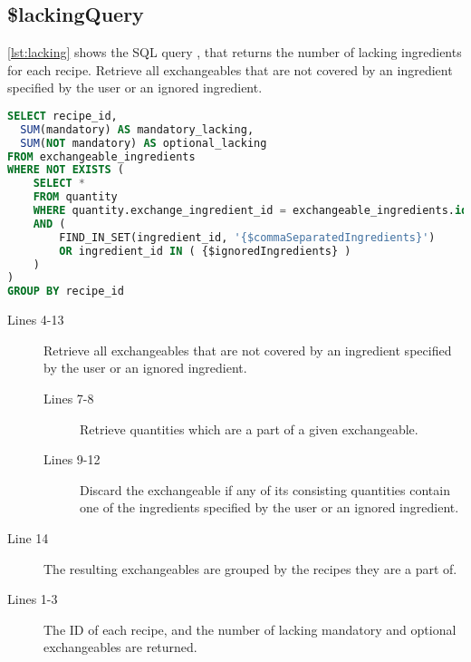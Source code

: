 \subsection*{\$lackingQuery}
\autoref{lst:lacking} shows the SQL query , that returns the number of lacking ingredients for each recipe. Retrieve all exchangeables that are not covered by an ingredient specified by the user or an ignored ingredient.
\begin{lstlisting}[language=SQL, morekeywords={IFNULL}, float=h, label={lst:lacking}, caption={\$lackingQuery, returns the number of lacking ingredients for each recipe.}]
SELECT recipe_id,
  SUM(mandatory) AS mandatory_lacking,
  SUM(NOT mandatory) AS optional_lacking
FROM exchangeable_ingredients
WHERE NOT EXISTS (
    SELECT * 
    FROM quantity
    WHERE quantity.exchange_ingredient_id = exchangeable_ingredients.id
    AND (
        FIND_IN_SET(ingredient_id, '{$commaSeparatedIngredients}')
        OR ingredient_id IN ( {$ignoredIngredients} )
    )
)
GROUP BY recipe_id
\end{lstlisting}
\begin{description}
\item[Lines 4-13] Retrieve all exchangeables that are not covered by an ingredient specified by the user or an ignored ingredient.
	\begin{description}
	\item[Lines 7-8] Retrieve quantities which are a part of a given exchangeable.
	\item[Lines 9-12] Discard the exchangeable if any of its consisting quantities contain one of the ingredients specified by the user or an ignored ingredient.
	\end{description}
\item[Line 14] The resulting exchangeables are grouped by the recipes they are a part of.
\item[Lines 1-3] The ID of each recipe, and the number of lacking mandatory and optional exchangeables are returned.
\end{description}



